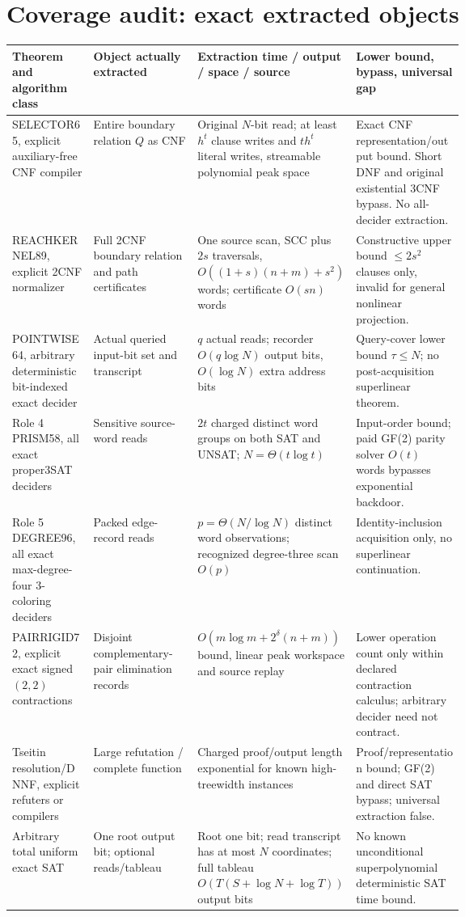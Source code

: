 \documentclass[11pt]{article}
\begin{document}
\section{Coverage audit: exact extracted objects}
{\scriptsize
\begin{tabularx}{\linewidth}{p{0.18\linewidth}p{0.235\linewidth}p{0.235\linewidth}X}
\toprule
Theorem and algorithm class & Object actually extracted & Extraction time / output / space / source & Lower bound, bypass, universal gap\\ \midrule
SELECTOR65, explicit auxiliary-free CNF compiler & Entire boundary relation $Q$ as CNF & Original $N$-bit read; at least $h^t$ clause writes and $th^t$ literal writes, streamable polynomial peak space & Exact CNF representation/output bound. Short DNF and original existential 3CNF bypass. No all-decider extraction.\\
REACHKERNEL89, explicit 2CNF normalizer & Full 2CNF boundary relation and path certificates & One source scan, SCC plus $2s$ traversals, $O((1+s)(n+m)+s^2)$ words; certificate $O(sn)$ words & Constructive upper bound $\le2s^2$ clauses only, invalid for general nonlinear projection.\\
POINTWISE64, arbitrary deterministic bit-indexed exact decider & Actual queried input-bit set and transcript & $q$ actual reads; recorder $O(q\log N)$ output bits, $O(\log N)$ extra address bits & Query-cover lower bound $\tau\le N$; no post-acquisition superlinear theorem.\\
Role 4 PRISM58, all exact proper3SAT deciders & Sensitive source-word reads & $2t$ charged distinct word groups on both SAT and UNSAT; $N=\Theta(t\log t)$ & Input-order bound; paid GF(2) parity solver $O(t)$ words bypasses exponential backdoor.\\
Role 5 DEGREE96, all exact max-degree-four 3-coloring deciders & Packed edge-record reads & $p=\Theta(N/\log N)$ distinct word observations; recognized degree-three scan $O(p)$ & Identity-inclusion acquisition only, no superlinear continuation.\\
PAIRRIGID72, explicit exact signed $(2,2)$ contractions & Disjoint complementary-pair elimination records & $O(m\log m+2^\delta(n+m))$ bound, linear peak workspace and source replay & Lower operation count only within declared contraction calculus; arbitrary decider need not contract.\\
Tseitin resolution/DNNF, explicit refuters or compilers & Large refutation / complete function & Charged proof/output length exponential for known high-treewidth instances & Proof/representation bound; GF(2) and direct SAT bypass; universal extraction false.\\
Arbitrary total uniform exact SAT & One root output bit; optional reads/tableau & Root one bit; read transcript has at most $N$ coordinates; full tableau $O(T(S+\log N+\log T))$ output bits & No known unconditional superpolynomial deterministic SAT time bound.\\
\bottomrule
\end{tabularx}
}
\end{document}

